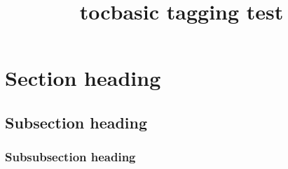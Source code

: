\documentclass{article}
\title{tocbasic tagging test}
\begin{document}
\tableofcontents

\section{Section heading}
\subsection{Subsection heading}
\subsubsection{Subsubsection heading}
\end{document}
